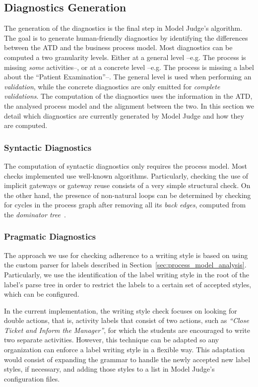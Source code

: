 \subsection{Diagnostics Generation}
\label{sec:diagnostics_generation}

The generation of the diagnostics is the final step in Model Judge's
algorithm. The goal is to generate human-friendly diagnostics by identifying the
differences between the ATD and the business process model. Most diagnostics can
be computed a two granularity levels. Either at a general level --e.g. The
process is missing \emph{some} activities--, or at a concrete level --e.g. The
process is missing a label about the ``Patient Examination''--. The general
level is used when performing an \emph{validation}, while the concrete
diagnostics are only emitted for \emph{complete validations}. The computation
of the diagnostics uses the information in the ATD, the analysed process model
and the alignment between the two. In this section we detail which diagnostics
are currently generated by Model Judge and how they are computed.

\subsubsection*{Syntactic Diagnostics}
The computation of syntactic diagnostics only requires the
process model. Most checks implemented use well-known algorithms. Particularly,
checking the use of implicit gateways or gateway reuse consists of a very simple
structural check. On the other hand, the presence of non-natural loops can be
determined by checking for cycles in the process graph after removing all its
{\em back edges}, computed from the {\em dominator tree}~\cite{LengauerT79}.

\subsubsection*{Pragmatic Diagnostics}
The approach we use for checking adherence to a writing style is based on
using the custom  parser for labels described in
Section~\ref{sec:process_model_analysis}. Particularly, we use the
identification of the label writing style in the root of the label's parse tree
in order to restrict the labels to a certain set of accepted styles, which can
be configured.

In the current implementation, the writing style check focuses on looking
for double actions, that is, activity labels that consist of two actions, such
as \textit{``Close Ticket and Inform the Manager''}, for which the students are
encouraged to write two separate activities. However, this technique can be
adapted so any organization can enforce a label writing style in a flexible way.
This adaptation would consist of expanding the grammar to handle the newly
accepted new label styles, if necessary, and adding those styles to a list in
Model Judge's configuration files.

